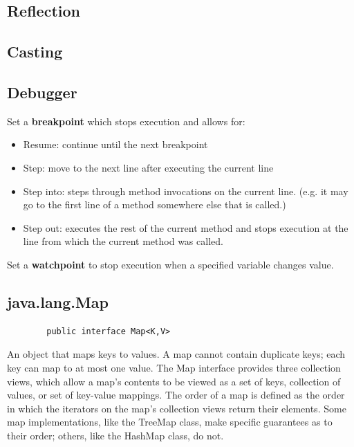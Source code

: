 \documentclass[a4paper, 11pt]{article}
\begin{document}
    \subsection{Reflection}

    \subsection{Casting}

    \subsection{Debugger}
        Set a \textbf{breakpoint} which stops execution and allows for:
        \begin{itemize}
            \item Resume: continue until the next breakpoint
            \item Step: move to the next line after executing the current line
            \item Step into: steps through method invocations on the current line. (e.g. it may go to the first line of a method somewhere else that is called.)
            \item Step out:  executes the rest of the current method and stops execution at the line from which the current method was called.
        \end{itemize}
        Set a \textbf{watchpoint} to stop execution when a specified variable changes value.

    \subsection{java.lang.Map}
        \begin{lstlisting}
        public interface Map<K,V>
        \end{lstlisting}
        An object that maps keys to values. A map cannot contain duplicate keys; each key can map to at most one value. The Map interface provides three collection views, which allow a map's contents to be viewed as a set of keys, collection of values, or set of key-value mappings. The order of a map is defined as the order in which the iterators on the map's collection views return their elements. Some map implementations, like the TreeMap class, make specific guarantees as to their order; others, like the HashMap class, do not.
\end{document}
